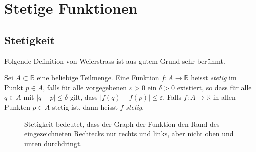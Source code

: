 \documentclass[../main.tex]{subfiles}
\begin{document}
\chapter{Stetige Funktionen}

\section{Stetigkeit}

Folgende Definition von Weierstrass
ist aus gutem Grund sehr berühmt.

\begin{definition}
  Sei $A \subset \mathbb{R}$ 
  eine beliebige Teilmenge.
  Eine Funktion
  $f \colon A \to \mathbb{R}$ 
  heisst \emph{stetig} im Punkt
  $p \in A$, falls für
  alle vorgegebenen $\varepsilon > 0$
  ein  $\delta > 0$ existiert,
  so dass für alle $q \in A$ 
  mit $|q-p| \leq \delta$ gilt,
  dass $|f(q) - f(p)| \leq \varepsilon$.
  Falls $f \colon A \to \mathbb{R}$ in
  allen Punkten $p \in A$ stetig ist,
  dann heisst $f$ \emph{stetig}.
\end{definition}

\begin{figure}[htb]
  \centering
  
  \caption{Stetigkeit bedeutet, dass der Graph
  der Funktion den Rand des eingezeichneten Rechtecks
nur rechts und links, aber nicht oben und unten
durchdringt.}%
  \label{fig:conti}
\end{figure}
\end{document}
